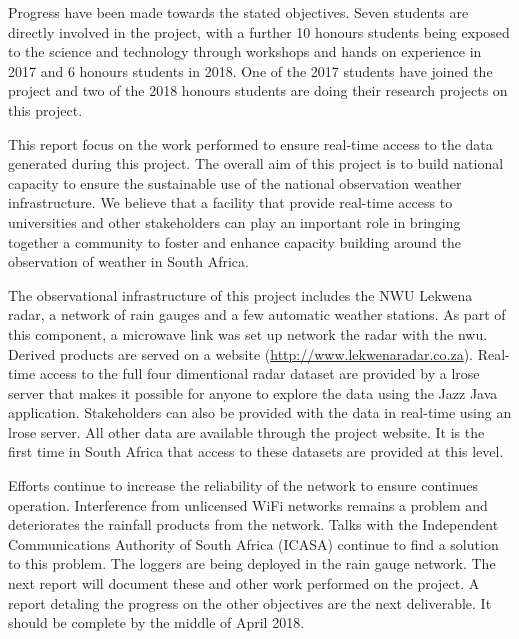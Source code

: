 \documentclass{wrcreport}
\begin{document}
Progress have been made towards the stated objectives. Seven students
are directly involved in the project, with a further 10 honours
students being exposed to the science and technology through workshops
and hands on experience in 2017 and 6 honours students in 2018. One of
the 2017 students have joined the project and two of the 2018 honours
students are doing their research projects on this project.

This report focus on the work performed to ensure real-time access to
the data generated during this project. The overall aim of this
project is to build national capacity to ensure the sustainable use of
the national observation weather infrastructure. We believe that a
facility that provide real-time access to universities and other
stakeholders can play an important role in bringing together a
community to foster and enhance capacity building around the
observation of weather in South Africa.

The observational infrastructure of this project includes the NWU
Lekwena radar, a network of rain gauges and a few automatic weather
stations. As part of this component, a microwave link was set up
network the radar with the \gls{nwu}. Derived products are served on a
website (\url{http://www.lekwenaradar.co.za}). Real-time access to the
full four dimentional radar dataset are provided by a \gls{lrose}
server that makes it possible for anyone to explore the data using the
Jazz Java application. Stakeholders can also be provided with the data
in real-time using an \gls{lrose} server. All other data are available
through the project website. It is the first time in South Africa that
access to these datasets are provided at this level.

Efforts continue to increase the reliability of the network to ensure
continues operation. Interference from unlicensed WiFi networks
remains a problem and deteriorates the rainfall products from the
network. Talks with the Independent Communications Authority of South
Africa (ICASA) continue to find a solution to this problem. The
loggers are being deployed in the rain gauge network. The next report
will document these and other work performed on the project. A report
detaling the progress on the other objectives are the next
deliverable. It should be complete by the middle of April 2018.

%

\begin{spacing}{0.3}
\linespread{0.8} \normalsize

\end{spacing}
\end{document}
